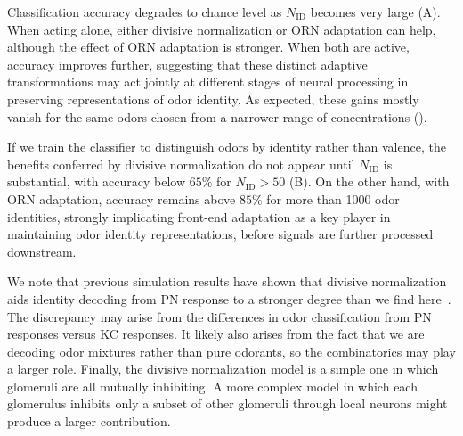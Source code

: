 \documentclass[9pt,lineno]{elife}
\begin{document}
Classification accuracy degrades to chance level as $N_{\text {ID}}$ becomes very large (A). When acting alone, either divisive normalization or ORN adaptation can help, although the effect of ORN adaptation is stronger. When both are active, accuracy improves further, suggesting that these distinct adaptive transformations may act jointly at different stages of neural processing in preserving representations of odor identity. As expected, these gains mostly vanish for the same odors chosen from a narrower range of concentrations ().

If we train the classifier to distinguish odors by identity rather than valence, the benefits conferred by divisive normalization do not appear until $N_{{\text {ID}}}$ is substantial, with accuracy below $65\%$ for $N_{{\text {ID}}} > 50$ (B). On the other hand, with ORN adaptation, accuracy remains above $85\%$ for more than 1000 odor identities, strongly implicating front-end adaptation as a key player in maintaining odor identity representations, before signals are further processed downstream. 

{\color{blue} 
We note that previous simulation results have shown that divisive normalization aids identity decoding from PN response to a stronger degree than we find here~\citep{divisive_normalization}. The discrepancy may arise from the differences in odor classification from PN responses versus KC responses. It likely also arises from the fact that we are decoding odor mixtures rather than pure odorants, so the combinatorics may play a larger role. Finally, the divisive normalization model is a simple one in which glomeruli are all mutually inhibiting. A more complex model in which each glomerulus inhibits only a subset of other glomeruli through local neurons might produce a larger contribution.
}
\end{document}

